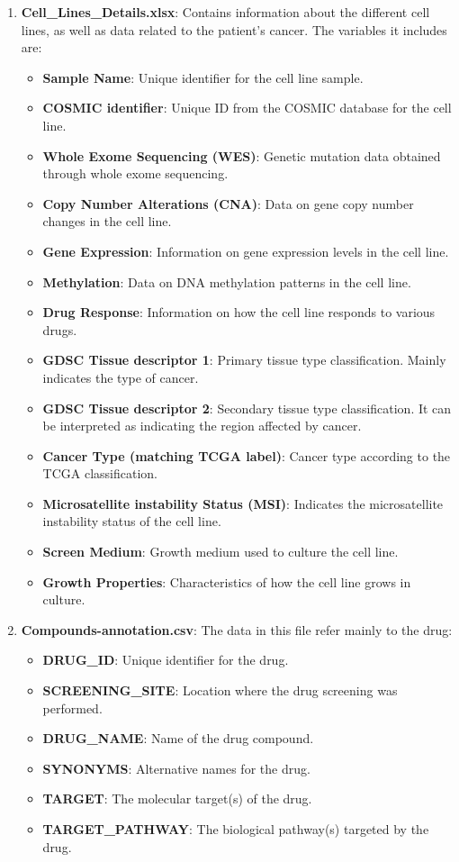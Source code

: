 \begin{enumerate}
      \item \textbf{Cell\_Lines\_Details.xlsx}: Contains information about the different cell lines, as well as data related to the patient's cancer. The variables it includes are:
      \begin{itemize}
        \item \textbf{Sample Name}: Unique identifier for the cell line sample.
        \item \textbf{COSMIC identifier}: Unique ID from the COSMIC database for the cell line.
        \item \textbf{Whole Exome Sequencing (WES)}: Genetic mutation data obtained through whole exome sequencing.
        \item \textbf{Copy Number Alterations (CNA)}: Data on gene copy number changes in the cell line.
        \item \textbf{Gene Expression}: Information on gene expression levels in the cell line.
        \item \textbf{Methylation}: Data on DNA methylation patterns in the cell line.
        \item \textbf{Drug Response}: Information on how the cell line responds to various drugs.
        \item \textbf{GDSC Tissue descriptor 1}: Primary tissue type classification. Mainly indicates the type of cancer.
        \item \textbf{GDSC Tissue descriptor 2}: Secondary tissue type classification. It can be interpreted as indicating the region affected by cancer.
        \item \textbf{Cancer Type (matching TCGA label)}: Cancer type according to the TCGA classification.
        \item \textbf{Microsatellite instability Status (MSI)}: Indicates the microsatellite instability status of the cell line.
        \item \textbf{Screen Medium}: Growth medium used to culture the cell line.
        \item \textbf{Growth Properties}: Characteristics of how the cell line grows in culture.
        \end{itemize}

    \item \textbf{Compounds-annotation.csv}: The data in this file refer mainly to the drug:
        \begin{itemize}
            \item \textbf{DRUG\_ID}: Unique identifier for the drug.
            \item \textbf{SCREENING\_SITE}: Location where the drug screening was performed.
            \item \textbf{DRUG\_NAME}: Name of the drug compound.
            \item \textbf{SYNONYMS}: Alternative names for the drug.
            \item \textbf{TARGET}: The molecular target(s) of the drug.
            \item \textbf{TARGET\_PATHWAY}: The biological pathway(s) targeted by the drug.
        \end{itemize}


\end{enumerate}
